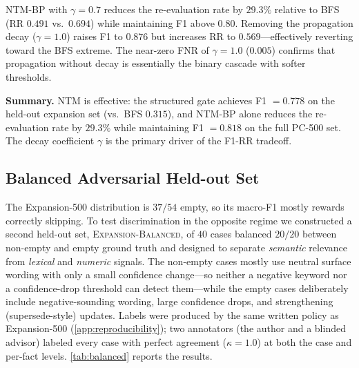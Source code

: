 \documentclass{article}
\theoremstyle{definition}
\begin{document}
NTM-BP with $\gamma=0.7$ reduces the re-evaluation rate by $29.3\%$
relative to BFS (RR $0.491$ vs.\ $0.694$) while maintaining F1 above
$0.80$.  Removing the propagation decay ($\gamma=1.0$) raises F1 to
$0.876$ but increases RR to $0.569$---effectively reverting toward the
BFS extreme.  The near-zero FNR of $\gamma=1.0$ ($0.005$) confirms that
propagation without decay is essentially the binary cascade with softer
thresholds.

\textbf{Summary.}  NTM is effective: the structured gate achieves
F1 $=0.778$ on the held-out expansion set (vs.\ BFS $0.315$), and NTM-BP alone
reduces the re-evaluation rate by $29.3\%$ while maintaining F1 $=0.818$
on the full PC-500 set.  The decay coefficient $\gamma$ is the
primary driver of the F1-RR tradeoff.

\subsection{Balanced Adversarial Held-out Set}
\label{sec:balanced}

The Expansion-500 distribution is $37/54$ empty, so its macro-F1 mostly
rewards correctly skipping.  To test discrimination in the opposite
regime we constructed a second held-out set, \textsc{Expansion-Balanced},
of $40$ cases balanced $20/20$ between non-empty and empty ground truth
and designed to separate \emph{semantic} relevance from \emph{lexical}
and \emph{numeric} signals.  The non-empty cases mostly use neutral
surface wording with only a small confidence change---so neither a
negative keyword nor a confidence-drop threshold can detect them---while
the empty cases deliberately include negative-sounding wording, large
confidence drops, and strengthening (supersede-style) updates.  Labels
were produced by the same written policy as Expansion-500
(\cref{app:reproducibility}); two annotators (the author and a blinded
advisor) labeled every case with perfect agreement ($\kappa=1.0$) at both
the case and per-fact levels.  \cref{tab:balanced} reports the
results.
\end{document}
